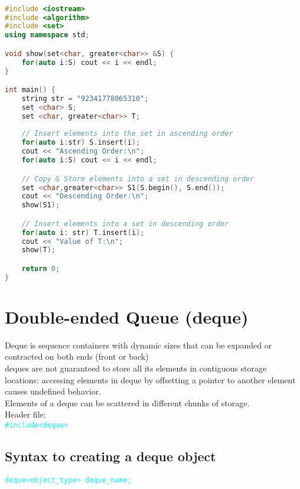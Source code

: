\begin{lstlisting}[language=c++]

#include <iostream>
#include <algorithm>
#include <set>
using namespace std;

void show(set<char, greater<char>> &S) {
    for(auto i:S) cout << i << endl;
}

int main() {
    string str = "92341778065310";
    set <char> S;
    set <char, greater<char>> T;
    
    // Insert elements into the set in ascending order 
    for(auto i:str) S.insert(i);
    cout << "Ascending Order:\n";
    for(auto i:S) cout << i << endl;

    // Copy & Store elements into a set in descending order
    set <char,greater<char>> S1(S.begin(), S.end());
    cout << "Descending Order:\n";
    show(S1);

    // Insert elements into a set in descending order
    for(auto i: str) T.insert(i);
    cout << "Value of T:\n";
    show(T);

    return 0;
}

\end{lstlisting}


\newpage
\section{\textbf{Double-ended Queue (deque)}}
Deque is sequence containers with dynamic sizes that can be expanded or contracted on both ends (front or back)\\
deques are not guaranteed to store all its elements in contiguous storage locations: accessing elements in deque by offsetting a pointer to another element causes undefined behavior.\\
Elements of a deque can be scattered in different chunks of storage.\\
Header file:\\
	\tab \tab \textcolor{cyan}{\texttt{\#include<deque>}}

\subsection{Syntax to creating a deque object}
	\tab \tab \textcolor{cyan}{\texttt{deque<object\_type> deque\_name;}}\\
	
